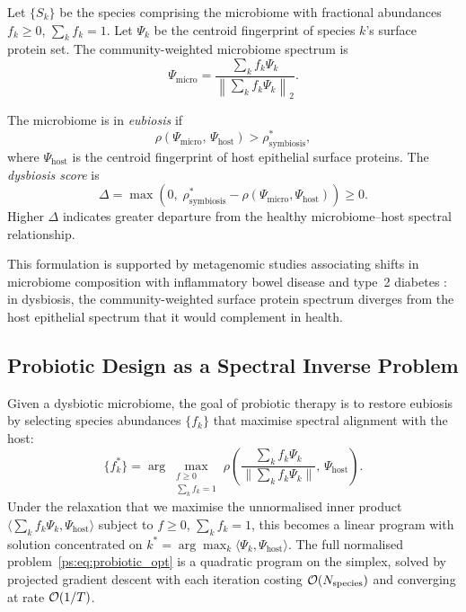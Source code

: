 \begin{definition}
\label{ps:def:microbiome_spectrum}
Let $\{S_k\}$ be the species comprising the microbiome with fractional
abundances $f_k \geq 0$, $\sum_k f_k = 1$. Let $\Psi_k$ be the centroid
fingerprint of species $k$'s surface protein set. The community-weighted
microbiome spectrum is
\begin{equation}
  \Psi_{\text{micro}} = \frac{\sum_k f_k \Psi_k}{\left\|\sum_k f_k \Psi_k\right\|_2}.
  \label{ps:eq:microbiome_spectrum}
\end{equation}
\end{definition}

\begin{definition}
\label{ps:def:eubiosis}
The microbiome is in \emph{eubiosis} if
\begin{equation}
  \rho(\Psi_{\text{micro}},\, \Psi_{\text{host}}) > \rho^*_{\text{symbiosis}},
\end{equation}
where $\Psi_{\text{host}}$ is the centroid fingerprint of host epithelial
surface proteins. The \emph{dysbiosis score} is
\begin{equation}
  \Delta = \max\!\left(0,\; \rho^*_{\text{symbiosis}} - \rho(\Psi_{\text{micro}},
    \Psi_{\text{host}})\right) \geq 0.
  \label{ps:eq:dysbiosis}
\end{equation}
Higher $\Delta$ indicates greater departure from the healthy
microbiome--host spectral relationship.
\end{definition}

This formulation is supported by metagenomic studies associating shifts in
microbiome composition with inflammatory bowel disease and type~2 diabetes
\citep{qin2012, turnbaugh2006}: in dysbiosis, the community-weighted surface
protein spectrum diverges from the host epithelial spectrum that it would
complement in health.

\subsection{Probiotic Design as a Spectral Inverse Problem}

Given a dysbiotic microbiome, the goal of probiotic therapy is to restore
eubiosis by selecting species abundances $\{f_k\}$ that maximise spectral
alignment with the host:
\begin{equation}
  \{f_k^*\} = \arg\max_{\substack{f \geq 0 \\ \sum_k f_k = 1}}
    \rho\!\left(\frac{\sum_k f_k \Psi_k}{\|\sum_k f_k \Psi_k\|},\, \Psi_{\text{host}}\right).
  \label{ps:eq:probiotic_opt}
\end{equation}
Under the relaxation that we maximise the unnormalised inner product
$\langle \sum_k f_k \Psi_k, \Psi_{\text{host}} \rangle$ subject to $f \geq 0$,
$\sum_k f_k = 1$, this becomes a linear program with solution concentrated on
$k^* = \arg\max_k \langle \Psi_k, \Psi_{\text{host}} \rangle$. The full
normalised problem~\eqref{ps:eq:probiotic_opt} is a quadratic program on the
simplex, solved by projected gradient descent with each iteration costing
$\mathcal{O}(N_{\text{species}})$ and converging at rate $\mathcal{O}(1/T)$.

